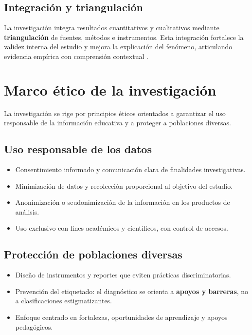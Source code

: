 \begin{refsection}
\subsection{Integración y triangulación}

La investigación integra resultados cuantitativos y cualitativos mediante \textbf{triangulación} de fuentes, métodos e instrumentos. Esta integración fortalece la validez interna del estudio y mejora la explicación del fenómeno, articulando evidencia empírica con comprensión contextual \parencite{creswell2018}.

\section{Marco ético de la investigación}

La investigación se rige por principios éticos orientados a garantizar el uso responsable de la información educativa y a proteger a poblaciones diversas.

\subsection{Uso responsable de los datos}

\begin{itemize}
\item Consentimiento informado y comunicación clara de finalidades investigativas.
\item Minimización de datos y recolección proporcional al objetivo del estudio.
\item Anonimización o seudonimización de la información en los productos de análisis.
\item Uso exclusivo con fines académicos y científicos, con control de accesos.
\end{itemize}

\subsection{Protección de poblaciones diversas}

\begin{itemize}
\item Diseño de instrumentos y reportes que eviten prácticas discriminatorias.
\item Prevención del etiquetado: el diagnóstico se orienta a \textbf{apoyos y barreras}, no a clasificaciones estigmatizantes.
\item Enfoque centrado en fortalezas, oportunidades de aprendizaje y apoyos pedagógicos.
\end{itemize}


\end{refsection}

